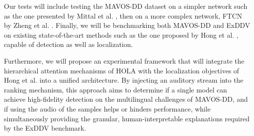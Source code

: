 \documentclass[12pt,a4paper]{report}
\begin{document}
Our tests will include testing the MAVOS-DD dataset on a simpler network such as the one presented by Mittal et al. \cite{mittal2020emotions}, then on a more complex network, FTCN by Zheng et al. \cite{zheng2021exploring}. Finally, we will be benchmarking both MAVOS-DD and ExDDV on existing state-of-the-art methods such as the one proposed by Hong et al. \cite{hong2024contrastive}, capable of detection as well as localization.

Furthermore, we will propose an experimental framework that will integrate the hierarchical attention mechanisms of HOLA with the localization objectives of Hong et al. into a unified architecture. By injecting an auditory stream into the ranking mechanism, this approach aims to determine if a single model can achieve high-fidelity detection on the multilingual challenges of MAVOS-DD, and if using the audio of the samples helps or hinders performance, while simultaneously providing the granular, human-interpretable explanations required by the ExDDV benchmark.













\end{document}
